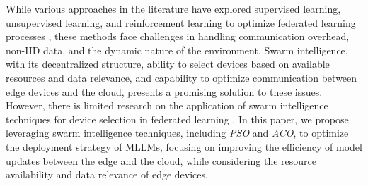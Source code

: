 While various approaches in the literature have explored supervised learning, unsupervised learning, and reinforcement learning to optimize federated learning processes \cite{mattoo2024device, eid2024federated, rjoub2021improving, muhammad2020deep, aradi2020survey, rjoub2024trust}, these methods face challenges in handling communication overhead, non-IID data, and the dynamic nature of the environment. Swarm intelligence, with its decentralized structure, ability to select devices based on available resources and data relevance, and capability to optimize communication between edge devices and the cloud, presents a promising solution to these issues. However, there is limited research on the application of swarm intelligence techniques for device selection in federated learning \cite{xing2023efficient, supriya2023particle}. In this paper, we propose leveraging swarm intelligence techniques, including \textit{PSO} and \textit{ACO}, to optimize the deployment strategy of MLLMs, focusing on improving the efficiency of model updates between the edge and the cloud, while considering the resource availability and data relevance of edge devices.

